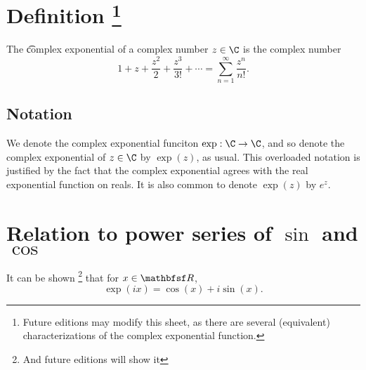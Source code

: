 
\section*{Definition
  \ifhmode\unskip\fi\footnote{
Future editions may modify this sheet, as there are several (equivalent) characterizations of the complex exponential function.
  }}

The \t{complex exponential} of a complex number $z \in \C $ is the complex number
  \[
1 + z + \frac{z^2}{2} + \frac{z^3}{3!} + \cdots = \sum_{n = 1}^{\infty}\frac{z^n}{n!}.
  \]

\subsection*{Notation}

We denote the complex exponential funciton $\exp: \C  \to \C $, and so denote the complex exponential of $z \in \C $ by $\exp(z)$, as usual.
This overloaded notation is justified by the fact that the complex exponential agrees with the real exponential function on reals.
It is also common to denote $\exp(z)$ by $e^z$.

\section*{Relation to power series of $\sin$ and $\cos$}

It can be shown
  \ifhmode\unskip\fi\footnote{
And future editions will show it
  }
that for $x \in \R $,
  \[
\exp(ix) = \cos(x) + i \sin(x).
  \]

\blankpage